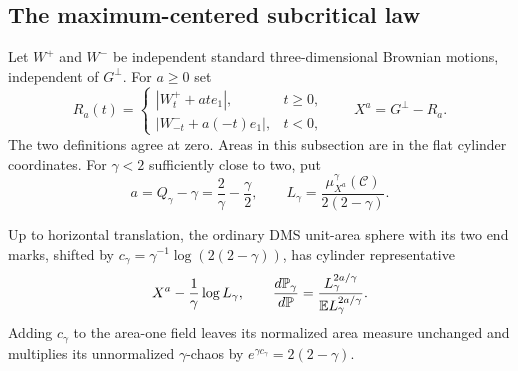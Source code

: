 \subsection{The maximum-centered subcritical law}\label{cont:shape-section}

Let $W^+$ and $W^-$ be independent standard three-dimensional Brownian motions,
independent of $G^\perp$.  For $a\geq0$ set
\[
 R_a(t)=
 \begin{cases}
   |W^+_t+at e_1|,&t\geq0,\\
   |W^-_{-t}+a(-t)e_1|,&t<0,
 \end{cases}
 \qquad X^a=G^\perp-R_a.
\]
The two definitions agree at zero.  Areas in this subsection are in the flat
cylinder coordinates.  For $\gamma<2$ sufficiently close to two, put
\[
 a=Q_\gamma-\gamma=\frac2\gamma-\frac\gamma2,
 \qquad
 L_\gamma=\frac{\mu_{X^a}^\gamma(\mathcal C)}{2(2-\gamma)}.
\]

\begin{lemma}\label{cont:shape-law}
Up to horizontal translation, the ordinary DMS unit-area sphere with its two
end marks, shifted by $c_\gamma=\gamma^{-1}\log(2(2-\gamma))$, has cylinder
representative
\begin{equation}\label{eq:original-1}
 X^a-\frac1\gamma\log L_\gamma,
 \qquad
 \frac{d\mathbb P_\gamma}{d\mathbb P}
       =\frac{L_\gamma^{2a/\gamma}}{\mathbb E L_\gamma^{2a/\gamma}}.
\end{equation}
Adding $c_\gamma$ to the area-one field leaves its normalized area measure
unchanged and multiplies its unnormalized $\gamma$-chaos by
$e^{\gamma c_\gamma}=2(2-\gamma)$.
\end{lemma}

